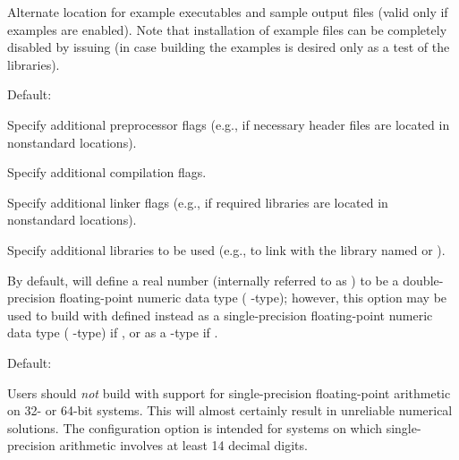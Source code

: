\begin{config}
\item {}

  Alternate location for example executables and sample output files (valid only if
  examples are enabled). Note that installation of example files can be completely disabled
  by issuing  (in case building the examples is desired only as a test of
  the {\sundials} libraries).

  Default: 

\item {}

  Specify additional {\C} preprocessor flags 
  (e.g.,  if necessary header files are located in
   nonstandard locations).

\item {}

  Specify additional {\C} compilation flags.

\item {}

  Specify additional linker flags (e.g.,  if
  required libraries are located in nonstandard locations).

\item {}

  Specify additional libraries to be used (e.g.,  to
  link with the library named  or ).

\item {}

  By default, {\sundials} will define a real number (internally referred to as
  ) to be a double-precision floating-point numeric data type
  ( {\C}-type); however, this option may be used to build {\sundials}
  with  defined instead as a single-precision floating-point
  numeric data type ( {\C}-type) if , or as a
   {\C}-type if .

  Default: 

  {\warn}Users should {\em not} build {\sundials} with support for
  single-precision floating-point arithmetic on 32- or 64-bit systems.
  This will almost certainly result in unreliable numerical solutions.
  The configuration option  is intended for
  systems on which single-precision arithmetic involves at least 14 decimal
  digits.

\end{config}

